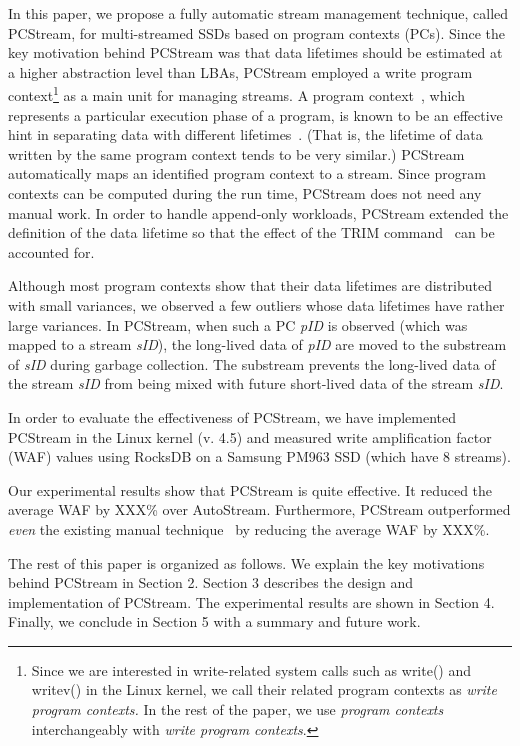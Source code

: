 In this paper, we propose a fully automatic stream management technique, called {\sf PCStream}, 
for multi-streamed SSDs based on program contexts (PCs).
Since the key motivation behind {\sf PCStream} was 
that data lifetimes should be estimated at a higher abstraction level than LBAs, 
{\sf PCStream} employed a write program context\footnote{Since we are interested in write-related 
system calls such as write() and writev() in the Linux kernel, 
we call their related program contexts as 
{\it write program contexts.} In the rest of the paper, we use 
{\it program contexts} interchangeably with {\it write program contexts}.}  
as a main unit for managing streams.   
A program context~\cite{PC}, which represents a particular execution phase of a program, 
is known to be an effective hint in separating data with different lifetimes~\cite{PCHa}.  
(That is, the lifetime of data written by the same program context tends to be very similar.)   
{\sf PCStream} automatically maps an identified program context to a stream.  
Since program contexts can be computed during the run time, 
{\sf PCStream} does not need any manual work.   
In order to handle append-only workloads, 
{\sf PCStream} extended the definition of the data lifetime 
so that the effect of the TRIM command~\cite{10} can be accounted for. 

Although most program contexts show that their data lifetimes are 
distributed with small variances, we observed a few outliers 
whose data lifetimes have rather large variances.
In {\sf PCStream}, 
when such a PC {\it pID} is observed (which was mapped to a stream {\it sID}), 
the long-lived data of {\it pID} are moved to the substream of {\it sID}
during garbage collection.  
The substream prevents the long-lived data of the stream {\it sID} 
from being mixed with future short-lived data of the stream {\it sID}.

In order to evaluate the effectiveness of PCStream, we have implemented PCStream 
in the Linux kernel (v. 4.5) and measured write amplification factor (WAF) values 
using RocksDB on a Samsung PM963 SSD (which have 8 streams).  

Our experimental results show that {\sf PCStream} is quite effective.  
It reduced the average WAF by XXX\% over AutoStream.  
Furthermore, PCStream outperformed {\it even} the existing manual technique~\cite{MultiStream} 
by reducing the average WAF by XXX\%.

The rest of this paper is organized as follows. 
We explain the key motivations behind {\sf PCStream} in Section 2. 
Section 3 describes 
the design and implementation of {\sf PCStream}.
The experimental results are shown in Section 4. 
Finally, we conclude in Section 5 with a summary and future work. 


